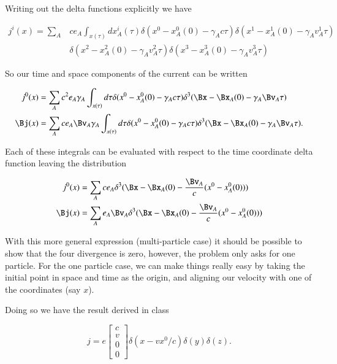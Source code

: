 {Writing out the delta functions explicitly we have

\begin{equation}\label{eqn:relElectroDynProblemSet3:1980}
\begin{aligned}
j^i(x) = \sum_A &c e_A \int_{x(\tau)} dx_A^i(\tau)
\delta(x^0 - x_A^0(0) - \gamma_A c \tau)
\delta(x^1 - x_A^1(0) - \gamma_A v_A^1 \tau) \\
&\delta(x^2 - x_A^2(0) - \gamma_A v_A^2 \tau)
\delta(x^3 - x_A^3(0) - \gamma_A v_A^3 \tau)
\end{aligned}
\end{equation}

So our time and space components of the current can be written

\begin{equation}\label{eqn:relElectroDynProblemSet3:2000}
\begin{aligned}
j^0(x) &= \sum_A c^2 e_A \gamma_A \int_{x(\tau)} d\tau
\delta(x^0 - x_A^0(0) - \gamma_A c \tau)
\delta^3(\Bx - \Bx_A(0) - \gamma_A \Bv_A \tau) \\
\Bj(x) &= \sum_A c e_A \Bv_A \gamma_A \int_{x(\tau)} d\tau
\delta(x^0 - x_A^0(0) - \gamma_A c \tau)
\delta^3(\Bx - \Bx_A(0) - \gamma_A \Bv_A \tau).
\end{aligned}
\end{equation}

Each of these integrals can be evaluated with respect to the time coordinate delta function leaving the distribution

\begin{equation}\label{eqn:relElectroDynProblemSet3:2020}
\begin{aligned}
j^0(x) &= \sum_A c e_A
\delta^3(\Bx - \Bx_A(0) - \frac{\Bv_A}{c} (x^0 - x_A^0(0))) \\
\Bj(x) &= \sum_A e_A \Bv_A
\delta^3(\Bx - \Bx_A(0) - \frac{\Bv_A}{c} (x^0 - x_A^0(0)))
\end{aligned}
\end{equation}

With this more general expression (multi-particle case) it should be possible to show that the four divergence is zero, however, the problem only asks for one particle.  For the one particle case, we can make things really easy by taking the initial point in space and time as the origin, and aligning our velocity with one of the coordinates (say \(x\)).

Doing so we have the result derived in class

\begin{equation}\label{eqn:relElectroDynProblemSet3:2040}
j = e
\begin{bmatrix}
c \\
v \\
0 \\
0
\end{bmatrix}
\delta(x - v x^0/c)
\delta(y)
\delta(z).
\end{equation}

}
